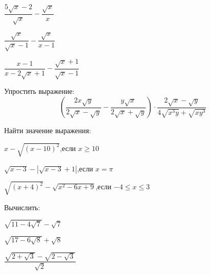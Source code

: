 \begin{listofex}
\begin{enumcols}[itemcolumns=3]
		\item \( \dfrac{5\sqrt{x}-2}{\sqrt{x}}-\dfrac{\sqrt{x}}{x} \)
		\item \( \dfrac{\sqrt{x}}{\sqrt{x}-1}-\dfrac{\sqrt{x}}{x-1} \)
		\item \( \dfrac{x-1}{x-2\sqrt{x}+1}-\dfrac{\sqrt{x}+1}{\sqrt{x}-1} \)
	\end{enumcols}
	\item Упростить выражение:
	\[ \left( \dfrac{2x\sqrt{y}}{2\sqrt{x}-\sqrt{y}}-\dfrac{y\sqrt{x}}{2\sqrt{x}+\sqrt{y}} \right)\cdot\dfrac{2\sqrt{x}-\sqrt{y}}{4\sqrt{x^3y}+\sqrt{xy^3}} \]
	\item Найти значение выражения:
	\begin{enumcols}[itemcolumns=2]
		\item \( x-\sqrt{(x-10)^2} \),\quad если \( x\ge10 \)
		\item \( \sqrt{x-3}-|\sqrt{x-3}+1| \),\quad если \( x=\pi\)
		\item \( \sqrt{(x+4)^2}-\sqrt{x^2-6x+9} \),\quad если \( -4\le x \le 3\)
	\end{enumcols}
	\item Вычислить:
	\begin{enumcols}[itemcolumns=2]
		\item \( \sqrt{11-4\sqrt{7}}-\sqrt{7} \)
		\item \( \sqrt{17-6\sqrt{8}}+\sqrt{8} \)
		\item \( \dfrac{\sqrt{2+\sqrt{3}}-\sqrt{2-\sqrt{3}}}{\sqrt{2}} \)
		\item {}
		\item {}
	\end{enumcols}
\end{listofex}